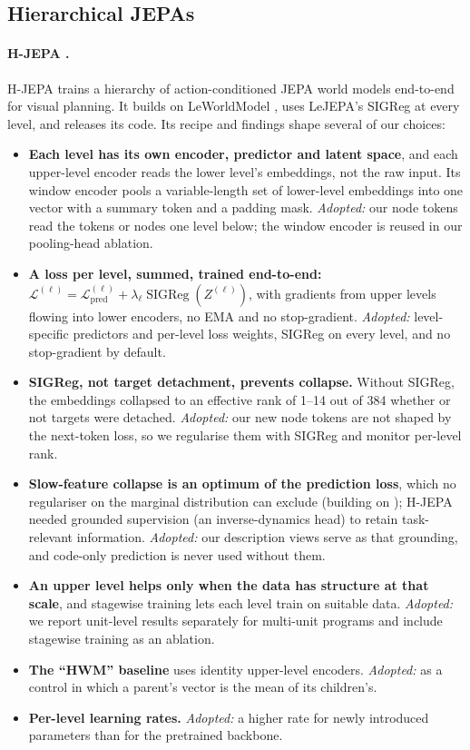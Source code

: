 \documentclass[11pt]{article}
\newcommand{\Lcal}{\mathcal{L}}
\newcommand{\SIGReg}{\operatorname{SIGReg}}
\begin{document}
\subsection{Hierarchical JEPAs}

\paragraph{H-JEPA \citep{zhang2026hjepa}.}
H-JEPA trains a hierarchy of action-conditioned JEPA world models end-to-end for visual planning. It builds on
LeWorldModel \citep{maes2026leworldmodel}, uses LeJEPA's SIGReg at every level, and releases its code. Its recipe
and findings shape several of our choices:
\begin{itemize}
  \item \textbf{Each level has its own encoder, predictor and latent space}, and each upper-level encoder reads the
        lower level's embeddings, not the raw input. Its window encoder pools a variable-length set of lower-level
        embeddings into one vector with a summary token and a padding mask.
        \emph{Adopted:} our node tokens read the tokens or nodes one level below; the window encoder is reused in our
        pooling-head ablation.
  \item \textbf{A loss per level, summed, trained end-to-end:} $\Lcal^{(\ell)}=\Lcal^{(\ell)}_{\text{pred}}+
        \lambda_\ell\SIGReg(Z^{(\ell)})$, with gradients from upper levels flowing into lower encoders, no EMA and
        no stop-gradient. \emph{Adopted:} level-specific predictors and per-level loss weights, SIGReg on every
        level, and no stop-gradient by default.
  \item \textbf{SIGReg, not target detachment, prevents collapse.} Without SIGReg, the embeddings collapsed to an
        effective rank of 1--14 out of 384 whether or not targets were detached. \emph{Adopted:} our new node tokens
        are not shaped by the next-token loss, so we regularise them with SIGReg and monitor per-level rank.
  \item \textbf{Slow-feature collapse is an optimum of the prediction loss}, which no regulariser on the marginal
        distribution can exclude (building on \citet{sobal2022slow}); H-JEPA needed grounded supervision (an
        inverse-dynamics head) to retain task-relevant information. \emph{Adopted:} our description views serve as
        that grounding, and code-only prediction is never used without them.
  \item \textbf{An upper level helps only when the data has structure at that scale}, and stagewise training lets
        each level train on suitable data. \emph{Adopted:} we report unit-level results separately for multi-unit
        programs and include stagewise training as an ablation.
  \item \textbf{The ``HWM'' baseline} uses identity upper-level encoders. \emph{Adopted:} as a control in which a
        parent's vector is the mean of its children's.
  \item \textbf{Per-level learning rates.} \emph{Adopted:} a higher rate for newly introduced parameters than for the
        pretrained backbone.
\end{itemize}
\end{document}
